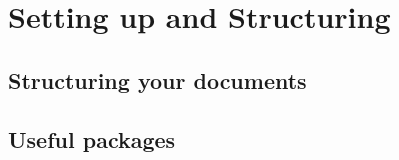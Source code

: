 \section{Setting up and Structuring}

\subsection{Structuring your documents}

\subsection{Useful packages}